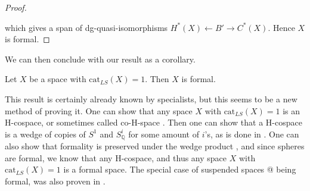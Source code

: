\begin{proof}
\begin{center}
        \end{center}

    which gives a span of dg-quasi-isomorphisms 
    $H^\ast(X)\longleftarrow B'\longrightarrow C^\ast(X)$. Hence $X$ is formal. 
\end{proof}

We can then conclude with our result as a corollary.
\begin{corollary}
    Let $X$ be a space with $\text{cat}_{LS}(X)=1$. Then $X$ is formal.     
\end{corollary}

This result is certainly already known by specialists, but this seems to be a new method 
of proving it. One can show that any space $X$ with $\text{cat}_{LS}(X)=1$ is an H-cospace, 
or sometimes called co-H-space \cite{hess}. Then one can show that a H-cospace is a wedge of 
copies of $S^1$ and $S_\mathbb{Q}^i$ for some amount of $i$'s, as is done in 
\cite{co-H-space}. One can also show that formality is preserved under the wedge product 
\cite{hess}, and since spheres are formal, we know that any H-cospace, and thus any space 
$X$ with $\text{cat}_{LS}(X)=1$ is a formal space. The special case of suspended spaces @
being formal, was also proven in \cite{FHT}.